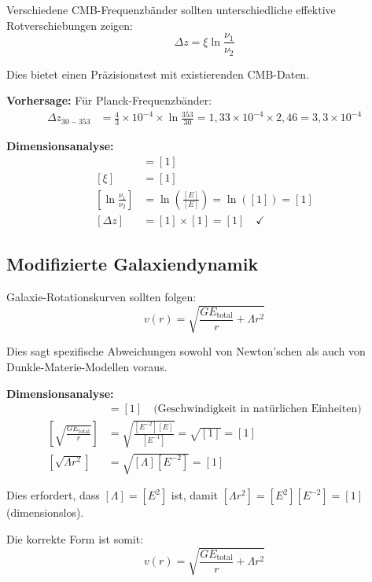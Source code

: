 \documentclass[12pt,a4paper]{report}
\begin{document}
	Verschiedene CMB-Frequenzbänder sollten unterschiedliche effektive Rotverschiebungen zeigen:
	\begin{equation}
		\Delta z = \xi \ln\frac{\nu_1}{\nu_2}
	\end{equation}
	
	Dies bietet einen Präzisionstest mit existierenden CMB-Daten.
	
	\textbf{Vorhersage:}
	Für Planck-Frequenzbänder:
	\begin{align}
		\Delta z_{30-353} &= \frac{4}{3} \times 10^{-4} \times \ln\frac{353}{30} = 1,33 \times 10^{-4} \times 2,46 = 3,3 \times 10^{-4}
	\end{align}
	
	\textbf{Dimensionsanalyse:}
	\begin{align}
		[\Delta z] &= [1] \\
		[\xi] &= [1] \\
		\left[\ln\frac{\nu_1}{\nu_2}\right] &= \ln\left(\frac{[E]}{[E]}\right) = \ln([1]) = [1] \\
		[\Delta z] &= [1] \times [1] = [1] \quad \checkmark
	\end{align}
	
\subsection{Modifizierte Galaxiendynamik}
\label{subsec:modified_galaxy_dynamics}

Galaxie-Rotationskurven sollten folgen:
\begin{equation}
	v(r) = \sqrt{\frac{GE_{\text{total}}}{r} + \Lambda r^2}
\end{equation}

Dies sagt spezifische Abweichungen sowohl von Newton'schen als auch von Dunkle-Materie-Modellen voraus.

\textbf{Dimensionsanalyse:}
\begin{align}
	[v(r)] &= [1] \quad \text{(Geschwindigkeit in natürlichen Einheiten)} \\
	\left[\sqrt{\frac{GE_{\text{total}}}{r}}\right] &= \sqrt{\frac{[E^{-2}][E]}{[E^{-1}]}} = \sqrt{[1]} = [1] \\
	[\sqrt{\Lambda r^2}] &= \sqrt{[\Lambda][E^{-2}]} = [1]
\end{align}

Dies erfordert, dass $[\Lambda] = [E^2]$ ist, damit $[\Lambda r^2] = [E^2][E^{-2}] = [1]$ (dimensionslos).

Die korrekte Form ist somit:
\begin{equation}
	v(r) = \sqrt{\frac{GE_{\text{total}}}{r} + \Lambda r^2}
\end{equation}
\end{document}
